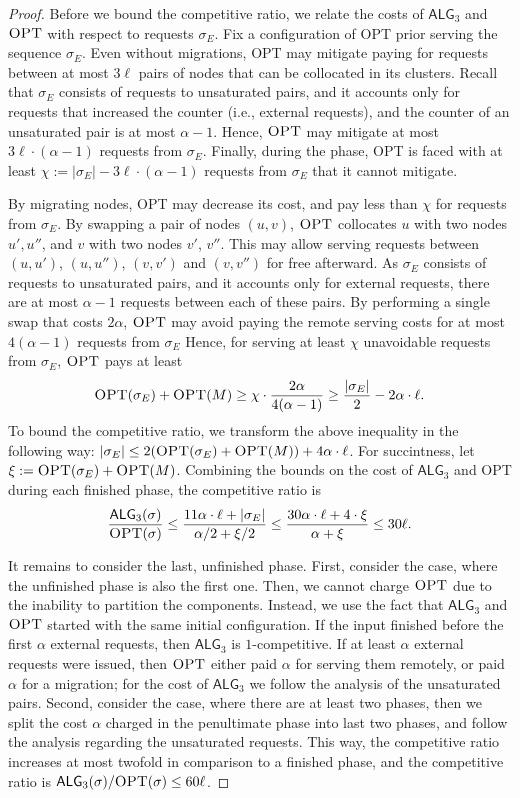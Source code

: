 \documentclass[a4paper,anonymous,USenglish]{lipics-v2019}
\newcommand{\OPT}{\textsc{OPT}\xspace}
\newcommand{\TAlg}{{\ensuremath{\textsf{ALG}_{3}}}\xspace}
\begin{document}
\begin{proof}
	\medskip
	Before we bound the competitive ratio, we relate the costs of $\TAlg$ and $\OPT$ with respect to requests $\sigma_E$.
	Fix a configuration of \OPT prior serving the sequence $\sigma_E$.
	Even without migrations, \OPT may mitigate paying for requests between at most $3\ell$ pairs of nodes that can be collocated in its clusters.
	Recall that $\sigma_E$ consists of requests to unsaturated pairs, and it accounts only for requests that increased the counter (i.e., external requests), and the counter of an unsaturated pair is at most $\alpha - 1$.
	Hence, $\OPT$ may mitigate at most $3\ell\cdot(\alpha - 1)$ requests from $\sigma_E$.
	Finally, during the phase, \OPT is faced with at least $\chi := |\sigma_E| - 3\ell\cdot(\alpha-1)$ requests from $\sigma_E$ that it cannot mitigate.

	By migrating nodes, \OPT may decrease its cost, and pay less than $\chi$ for requests from $\sigma_E$.
	By swapping a pair of nodes $(u,v)$, $\OPT$ collocates $u$ with two nodes $u', u''$, and $v$ with two nodes $v'$, $v''$.
	This may allow serving requests between $(u,u')$, $(u,u'')$, $(v,v')$ and $(v,v'')$ for free afterward.
	As $\sigma_E$ consists of requests to unsaturated pairs, and it accounts only for external requests, there are at most $\alpha-1$ requests between each of these pairs.
	By performing a single swap that costs $2\alpha$, $\OPT$ may avoid paying the remote serving costs for at most $4 (\alpha - 1)$ requests from $\sigma_E$
	Hence, for serving at least $\chi$ unavoidable requests from $\sigma_E$, $\OPT$ pays at least
	\[
		\OPT(\sigma_E) + \OPT(M) \geq \chi \cdot \frac{2\alpha}{4 (\alpha-1)}\geq \frac{|\sigma_E|} {2} - 2 \alpha \cdot \ell.
	\]
	To bound the competitive ratio, we transform the above inequality in the following way: $|\sigma_E| \leq 2(\OPT(\sigma_E)+\OPT(M)) + 4\alpha \cdot \ell$.
	For succintness, let $\xi := \OPT(\sigma_E) + \OPT(M)$.
	Combining the bounds on the cost of \TAlg and \OPT during each finished phase, the competitive ratio is
%
	\[
		\frac{\TAlg(\sigma)}{\OPT(\sigma)} \leq \frac{11\alpha \cdot \ell + |\sigma_E|}{\alpha/2 + \xi/2} \leq \frac{30\alpha\cdot\ell + 4\cdot \xi}{\alpha + \xi} \leq 30 \ell.
	\]
%	
	\medskip
	
	It remains to consider the last, unfinished phase.
	First, consider the case, where the unfinished phase is also the first one.
	Then, we cannot charge $\OPT$ due to the inability to partition the components.
	Instead, we use the fact that \TAlg and $\OPT$ started with the same initial configuration.
	If the input finished before the first $\alpha$ external requests, then \TAlg is $1$-competitive.
	If at least $\alpha$ external requests were issued, then $\OPT$ either paid $\alpha$ for serving them remotely, or paid $\alpha$ for a migration; for the cost of \TAlg we follow the analysis of the unsaturated pairs.
	Second, consider the case, where there are at least two phases, then we split the cost $\alpha$ charged in the penultimate phase into last two phases, and follow the analysis regarding the unsaturated requests.
	This way, the competitive ratio increases at most twofold in comparison to a finished phase, and the competitive ratio is $\TAlg(\sigma)/\OPT(\sigma) \leq 60\ell$.
\end{proof}
\end{document}
